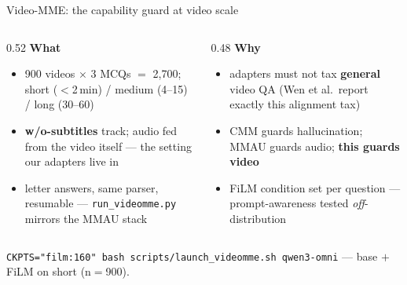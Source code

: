 \documentclass[aspectratio=169,11pt]{beamer}
\begin{document}
\begin{frame}{Video-MME: the capability guard at video scale}
\begin{columns}[T]
\begin{column}{0.52\textwidth}
{\small\textbf{What}}
\begin{itemize}\footnotesize
\item 900 videos $\times$ 3 MCQs $=$ 2{,}700; short ($<$2\,min) / medium (4--15) / long (30--60)
\item \textbf{w/o-subtitles} track; audio fed from the video itself --- the setting our adapters live in
\item letter answers, same parser, resumable --- \texttt{run\_videomme.py} mirrors the MMAU stack
\end{itemize}
\end{column}
\begin{column}{0.48\textwidth}
{\small\textbf{Why}}
\begin{itemize}\footnotesize
\item adapters must not tax \textbf{general} video QA (Wen et al.\ report exactly this alignment tax)
\item CMM guards hallucination; MMAU guards audio; \textbf{this guards video}
\item FiLM condition set per question --- prompt-awareness tested \emph{off}-distribution
\end{itemize}
\end{column}
\end{columns}
\vfill
{\footnotesize \texttt{CKPTS="film:160" bash scripts/launch\_videomme.sh qwen3-omni} --- base $+$ FiLM on short (n$=$900).}
\end{frame}
\end{document}
